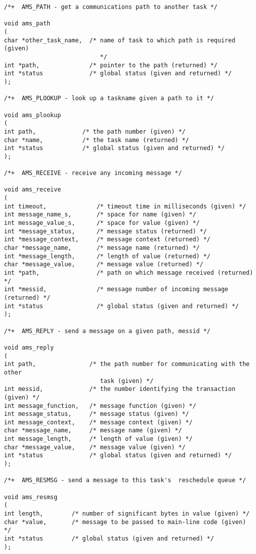 \begin{verbatim}
/*+  AMS_PATH - get a communications path to another task */

void ams_path
(
char *other_task_name,  /* name of task to which path is required (given)
                           */
int *path,              /* pointer to the path (returned) */
int *status             /* global status (given and returned) */
);

/*+  AMS_PLOOKUP - look up a taskname given a path to it */

void ams_plookup
(
int path,             /* the path number (given) */
char *name,           /* the task name (returned) */
int *status           /* global status (given and returned) */
);

/*+  AMS_RECEIVE - receive any incoming message */

void ams_receive
(
int timeout,              /* timeout time in milliseconds (given) */
int message_name_s,       /* space for name (given) */
int message_value_s,      /* space for value (given) */
int *message_status,      /* message status (returned) */
int *message_context,     /* message context (returned) */
char *message_name,       /* message name (returned) */
int *message_length,      /* length of value (returned) */
char *message_value,      /* message value (returned) */
int *path,                /* path on which message received (returned) */
int *messid,              /* message number of incoming message (returned) */
int *status               /* global status (given and returned) */
);

/*+  AMS_REPLY - send a message on a given path, messid */

void ams_reply
(
int path,               /* the path number for communicating with the other
                           task (given) */
int messid,             /* the number identifying the transaction (given) */
int message_function,   /* message function (given) */
int message_status,     /* message status (given) */
int message_context,    /* message context (given) */
char *message_name,     /* message name (given) */
int message_length,     /* length of value (given) */
char *message_value,    /* message value (given) */
int *status             /* global status (given and returned) */
);

/*+  AMS_RESMSG - send a message to this task's  reschedule queue */

void ams_resmsg
(
int length,        /* number of significant bytes in value (given) */
char *value,       /* message to be passed to main-line code (given) */
int *status        /* global status (given and returned) */
);


\end{verbatim}
